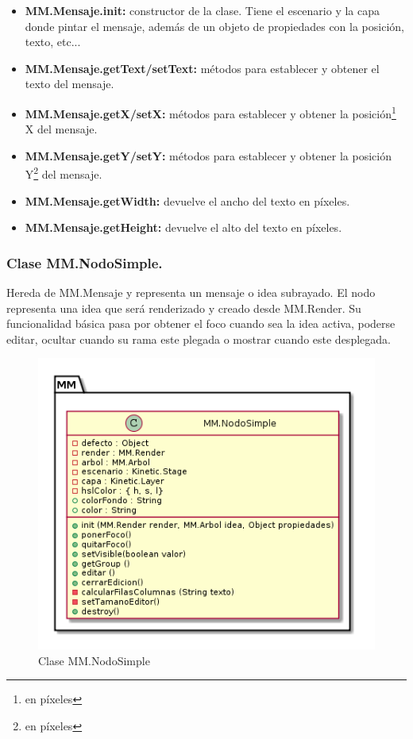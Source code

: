 \begin{itemize}
\item \textbf{MM.Mensaje.init:} constructor de la clase. Tiene el escenario y la capa donde pintar el mensaje, además de un objeto de propiedades con la posición, texto, etc...
\item \textbf{MM.Mensaje.getText/setText:} métodos para establecer y obtener el texto del mensaje. 
\item \textbf{MM.Mensaje.getX/setX:} métodos para establecer y obtener la posición\footnote{en píxeles} X del mensaje.
\item \textbf{MM.Mensaje.getY/setY:} métodos para establecer y obtener la posición Y\footnote{en píxeles} del mensaje.
\item \textbf{MM.Mensaje.getWidth:} devuelve el ancho del texto en píxeles.
\item \textbf{MM.Mensaje.getHeight:} devuelve el alto del texto en píxeles.
\end{itemize}

\subsubsection{Clase MM.NodoSimple.}
Hereda de MM.Mensaje y representa un mensaje o idea subrayado. El nodo representa una idea que será renderizado y creado desde MM.Render. Su funcionalidad básica pasa por obtener el foco cuando sea la idea activa, poderse editar, ocultar cuando su rama este plegada o mostrar cuando este desplegada.

\begin{figure}[tbph]
\centering
\includegraphics[width=0.6\linewidth]{imagenes/diagrama-clase-mm-nodosimple}
\caption{Clase MM.NodoSimple}
\label{fig:diagrama-clase-mm-nodosimple}
\end{figure}

